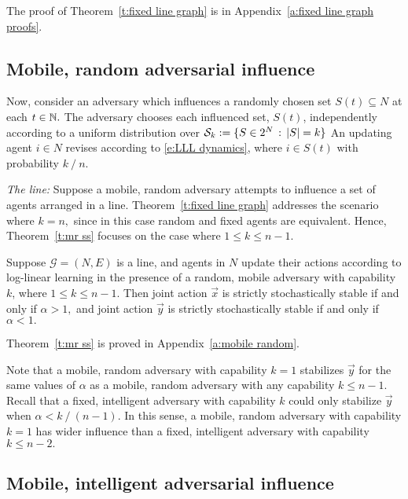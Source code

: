 The proof of Theorem~\ref{t:fixed line graph} is in Appendix~\ref{a:fixed line graph proofs}.


\subsection{Mobile, random adversarial influence}

Now, consider an adversary which influences a randomly chosen set $S(t)\subseteq N$ at each $t\in \mathbb{N}.$ The adversary chooses each influenced set, $S(t)$, independently according to a uniform distribution over 
$\mathcal{S}_k:=\{S\in 2^N\,:\, |S| = k\}$
An updating agent $i\in N$ revises according to \eqref{e:LLL dynamics}, where $i\in S(t)$ with probability $k\mathop{/}n$.%

\noindent\emph{The line:} 
Suppose a mobile, random adversary attempts to influence a set of agents arranged in a line. Theorem~\ref{t:fixed line graph} addresses the scenario where $k = n,$ since in this case random and fixed agents are equivalent. Hence, Theorem~\ref{t:mr ss} focuses on the case where $1\leq k\leq n-1.$

\begin{Theorem}\label{t:mr ss}
Suppose $\mathcal{G} = (N,E)$ is a line, and agents in $N$ update their actions according to log-linear learning in the presence of a random, mobile adversary with capability $k$, where $1\leq k\leq n-1$. Then joint action $\vec{x}$ is strictly stochastically stable if and only if $\alpha >1,$ and joint action $\vec{y}$ is strictly stochastically stable if and only if $\alpha<1.$ 
\end{Theorem}

Theorem~\ref{t:mr ss} is proved in Appendix~\ref{a:mobile random}.

Note that a mobile, random adversary with capability $k=1$ stabilizes $\vec{y}$ for the same values of $\alpha$ as a mobile, random adversary with any capability $k\leq n-1.$  Recall that a fixed, intelligent adversary with capability $k$ could only stabilize $\vec{y}$ when $\alpha < k\mathop{/} (n-1)$. In this sense, a mobile, random adversary with capability $k=1$ has wider influence than a fixed, intelligent adversary with capability $k\leq n-2.$ 


\subsection{Mobile, intelligent adversarial influence}

